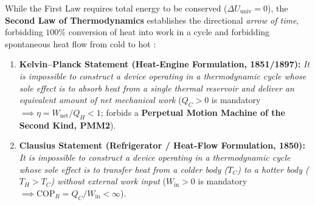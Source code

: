 While the First Law requires total energy to be conserved ($\Delta U_{\mathrm{univ}} = 0$), the \textbf{Second Law of Thermodynamics} establishes the directional \emph{arrow of time}, forbidding $100\%$ conversion of heat into work in a cycle and forbidding spontaneous heat flow from cold to hot :
\begin{enumerate}
  \item \textbf{Kelvin--Planck Statement (Heat-Engine Formulation, 1851/1897):} \emph{It is impossible to construct a device operating in a thermodynamic cycle whose sole effect is to absorb heat from a single thermal reservoir and deliver an equivalent amount of net mechanical work} ($Q_C > 0$ is mandatory $\implies \eta = W_{\mathrm{net}}/Q_H < 1$; forbids a \textbf{Perpetual Motion Machine of the Second Kind, PMM2}).
  \item \textbf{Clausius Statement (Refrigerator / Heat-Flow Formulation, 1850):} \emph{It is impossible to construct a device operating in a thermodynamic cycle whose sole effect is to transfer heat from a colder body ($T_C$) to a hotter body ($T_H > T_C$) without external work input} ($W_{\mathrm{in}} > 0$ is mandatory $\implies \mathrm{COP}_R = Q_C/W_{\mathrm{in}} < \infty$).
\end{enumerate}

